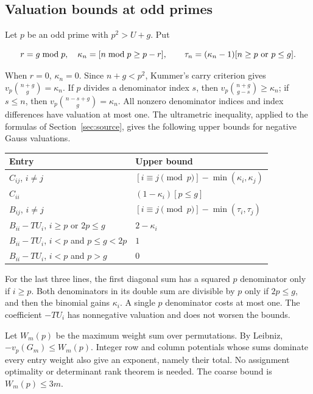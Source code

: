 \subsection{Valuation bounds at odd primes}\label{subsec:odd}

Let \(p\) be an odd prime with \(p^2>U+g\). Put

\[
 r=g\bmod p,\quad \kappa_n=[n\bmod p\ge p-r],\qquad
 \tau_n=(\kappa_n-1)[n\ge p\ \hbox{or}\ p\le g].
\]

When \(r=0\), \(\kappa_n=0\). Since \(n+g<p^2\), Kummer's carry criterion
gives \(v_p\binom{n+g}{g}=\kappa_n\). If \(p\) divides a denominator index
\(s\), then \(v_p\binom{n+g}{g-s}\ge\kappa_n\); if \(s\le n\), then
\(v_p\binom{n-s+g}{g}=\kappa_n\). All nonzero denominator indices and index
differences have valuation at most one. The ultrametric inequality, applied
to the formulas of Section~\ref{sec:source}, gives the following upper
bounds for negative Gauss valuations.

\begin{center}
\begin{tabular}{p{}p{}}
\hline
Entry & Upper bound \\
\hline
\(C_{ij}\), \(i\ne j\) & \([i\equiv j\pmod p]-\min(\kappa_i,\kappa_j)\) \\
\(C_{ii}\) & \((1-\kappa_i)[p\le g]\) \\
\(B_{ij}\), \(i\ne j\) & \([i\equiv j\pmod p]-\min(\tau_i,\tau_j)\) \\
\(B_{ii}-TU_i\), \(i\ge p\) or \(2p\le g\) & \(2-\kappa_i\) \\
\(B_{ii}-TU_i\), \(i<p\) and \(p\le g<2p\) & \(1\) \\
\(B_{ii}-TU_i\), \(i<p\) and \(p>g\) & \(0\) \\
\hline
\end{tabular}
\end{center}

For the last three lines, the first diagonal sum has a squared \(p\)
denominator only if \(i\ge p\). Both denominators in its double sum are
divisible by \(p\) only if \(2p\le g\), and then the binomial gains
\(\kappa_i\). A single \(p\) denominator costs at most one. The coefficient
\(-TU_i\) has nonnegative valuation and does not worsen the bounds.

Let \(W_m(p)\) be the maximum weight sum over permutations. By Leibniz,
\(-v_p(G_m)\le W_m(p)\). Integer row and column potentials whose sums
dominate every entry weight also give an exponent, namely their total. No
assignment optimality or determinant rank theorem is needed. The coarse
bound is \(W_m(p)\le3m\).

